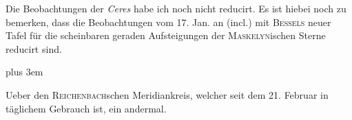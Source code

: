 \par\indent Die Beobachtungen der \textit{Ceres} habe ich noch nicht reducirt. Es ist hiebei noch zu bemerken,
dass die Beobachtungen vom 17. Jan. an (incl.) mit \textsc{Bessels} neuer Tafel für die scheinbaren
geraden Aufsteigungen der \textsc{Maskelyn}ischen Sterne reducirt sind.

{\rightskip=0pt plus 3em
\par\indent Ueber den \textsc{Reichenbach}schen Meridiankreis, welcher seit dem 21. Februar in täglichem
Gebrauch ist, ein andermal.\par}
